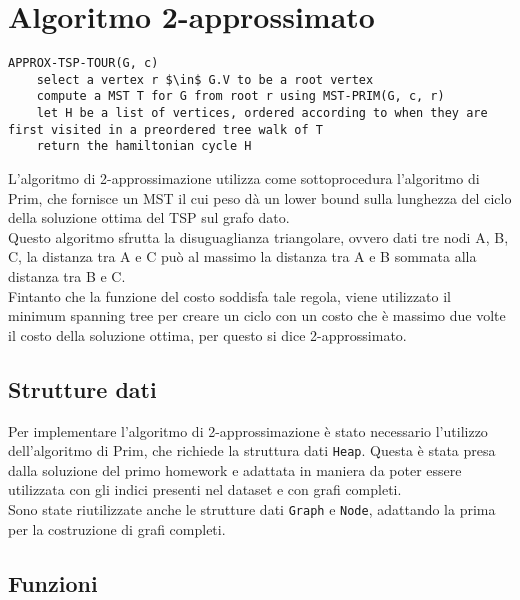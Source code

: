 \section{Algoritmo 2-approssimato}\label{two_approx}

\begin{lstlisting}[mathescape=true]
APPROX-TSP-TOUR(G, c)
	select a vertex r $\in$ G.V to be a root vertex
	compute a MST T for G from root r using MST-PRIM(G, c, r)
	let H be a list of vertices, ordered according to when they are first visited in a preordered tree walk of T
	return the hamiltonian cycle H
\end{lstlisting}	

L'algoritmo di 2-approssimazione utilizza come sottoprocedura l'algoritmo di Prim, che fornisce un MST il cui peso dà un lower bound sulla lunghezza del ciclo della soluzione ottima del TSP sul grafo dato.\\
Questo algoritmo sfrutta la disuguaglianza triangolare, ovvero dati tre nodi A, B, C, la distanza tra A e C può al massimo la distanza tra A e B sommata alla distanza tra B e C.\\
Fintanto che la funzione del costo soddisfa tale regola, viene utilizzato il minimum spanning tree per creare un ciclo con un costo che è massimo due volte il costo della soluzione ottima, per questo si dice 2-approssimato.

\subsection{Strutture dati}

	Per implementare l'algoritmo di 2-approssimazione è stato necessario l'utilizzo dell'algoritmo di Prim, che richiede la struttura dati \texttt{Heap}.
	Questa è stata presa dalla soluzione del primo homework e adattata in maniera da poter essere utilizzata con gli indici presenti nel dataset e con grafi completi.\\
	Sono state riutilizzate anche le strutture dati \texttt{Graph} e \texttt{Node}, adattando la prima per la costruzione di grafi completi.
	
\subsection{Funzioni}
	
